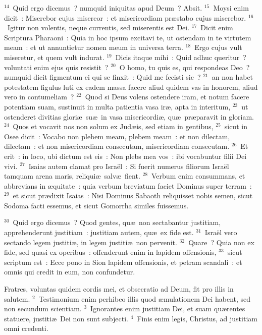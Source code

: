 ${}^{14}$~Quid ergo dicemus~? numquid iniquitas apud Deum~? Absit.
${}^{15}$~Moysi enim dicit~: Miserebor cujus misereor~: et misericordiam pr\ae stabo cujus miserebor.
${}^{16}$~Igitur non volentis, neque currentis, sed miserentis est Dei.
${}^{17}$~Dicit enim Scriptura Pharaoni~: Quia in hoc ipsum excitavi te, ut ostendam in te virtutem meam~: et ut annuntietur nomen meum in universa terra.
${}^{18}$~Ergo cujus vult miseretur, et quem vult indurat.
${}^{19}$~Dicis itaque mihi~: Quid adhuc queritur~? voluntati enim ejus quis resistit~?
${}^{20}$~O homo, tu quis es, qui respondeas Deo~? numquid dicit figmentum ei qui se finxit~: Quid me fecisti sic~?
${}^{21}$~an non habet potestatem figulus luti ex eadem massa facere aliud quidem vas in honorem, aliud vero in contumeliam~?
${}^{22}$~Quod si Deus volens ostendere iram, et notum facere potentiam suam, sustinuit in multa patientia vasa ir\ae , apta in interitum,
${}^{23}$~ut ostenderet divitias glori\ae\ su\ae\ in vasa misericordi\ae , qu\ae\ pr\ae paravit in gloriam.
${}^{24}$~Quos et vocavit nos non solum ex Jud\ae is, sed etiam in gentibus,
${}^{25}$~sicut in Osee dicit~: Vocabo non plebem meam, plebem meam~: et non dilectam, dilectam~: et non misericordiam consecutam, misericordiam consecutam.
${}^{26}$~Et erit~: in loco, ubi dictum est eis~: Non plebs mea vos~: ibi vocabuntur filii Dei vivi.
${}^{27}$~Isaias autem clamat pro Isra\"el~: Si fuerit numerus filiorum Isra\"el tamquam arena maris, reliqui\ae\ salv\ae\ fient.
${}^{28}$~Verbum enim consummans, et abbrevians in \ae quitate~: quia verbum breviatum faciet Dominus super terram~:
${}^{29}$~et sicut pr\ae dixit Isaias~: Nisi Dominus Sabaoth reliquisset nobis semen, sicut Sodoma facti essemus, et sicut Gomorrha similes fuissemus.


${}^{30}$~Quid ergo dicemus~? Quod gentes, qu\ae\ non sectabantur justitiam, apprehenderunt justitiam~: justitiam autem, qu\ae\ ex fide est.
${}^{31}$~Isra\"el vero sectando legem justiti\ae , in legem justiti\ae\ non pervenit.
${}^{32}$~Quare~? Quia non ex fide, sed quasi ex operibus~: offenderunt enim in lapidem offensionis,
${}^{33}$~sicut scriptum est~: Ecce pono in Sion lapidem offensionis, et petram scandali~: et omnis qui credit in eum, non confundetur.

\lettrine[lines=3,image=true,loversize=0.05,lraise=-0.03]{F}{}ratres, voluntas quidem cordis mei, et obsecratio ad Deum, fit pro illis in salutem.
${}^{2}$~Testimonium enim perhibeo illis quod \ae mulationem Dei habent, sed non secundum scientiam.
${}^{3}$~Ignorantes enim justitiam Dei, et suam qu\ae rentes statuere, justiti\ae\ Dei non sunt subjecti.
${}^{4}$~Finis enim legis, Christus, ad justitiam omni credenti.


